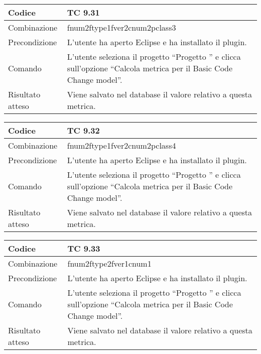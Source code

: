 \begin{table}[ht]
\begin{tabular}{|p{3cm}|p{9cm}|}
\hline
\cellcolor{lightgray}Codice				& TC 9.31								\\
\hline
\cellcolor{lightgray}Combinazione		& fnum2ftype1fver2cnum2pclass3									\\
\hline
\cellcolor{lightgray}Precondizione		& L'utente ha aperto Eclipse e ha installato il plugin.		\\
\hline
\cellcolor{lightgray}Comando			& L'utente seleziona il progetto ``Progetto ''  e clicca sull'opzione ``Calcola metrica per il Basic Code Change model''.	\\
\hline
\cellcolor{lightgray}Risultato atteso	& Viene salvato nel database il valore relativo a questa metrica.\\
\hline
\end{tabular}
\end{table}

\begin{table}[ht]
\begin{tabular}{|p{3cm}|p{9cm}|}
\hline
\cellcolor{lightgray}Codice				& TC 9.32								\\
\hline
\cellcolor{lightgray}Combinazione		& fnum2ftype1fver2cnum2pclass4									\\
\hline
\cellcolor{lightgray}Precondizione		& L'utente ha aperto Eclipse e ha installato il plugin.		\\
\hline
\cellcolor{lightgray}Comando			& L'utente seleziona il progetto ``Progetto ''  e clicca sull'opzione ``Calcola metrica per il Basic Code Change model''.	\\
\hline
\cellcolor{lightgray}Risultato atteso	& Viene salvato nel database il valore relativo a questa metrica.\\
\hline
\end{tabular}
\end{table}

\begin{table}[ht]
\begin{tabular}{|p{3cm}|p{9cm}|}
\hline
\cellcolor{lightgray}Codice				& TC 9.33								\\
\hline
\cellcolor{lightgray}Combinazione		& fnum2ftype2fver1cnum1									\\
\hline
\cellcolor{lightgray}Precondizione		& L'utente ha aperto Eclipse e ha installato il plugin.		\\
\hline
\cellcolor{lightgray}Comando			& L'utente seleziona il progetto ``Progetto ''  e clicca sull'opzione ``Calcola metrica per il Basic Code Change model''.	\\
\hline
\cellcolor{lightgray}Risultato atteso	& Viene salvato nel database il valore relativo a questa metrica.\\
\hline
\end{tabular}
\end{table}

